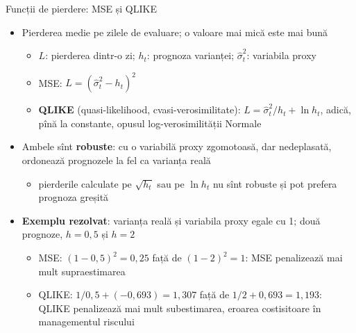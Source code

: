 \begin{frame}{Funcții de pierdere: MSE și QLIKE}
\itemsize{\small}
\begin{itemize}
    \item Pierderea medie pe zilele de evaluare; o valoare mai mică este mai bună 
    \begin{itemize}
        \item $L$: pierderea dintr-o zi; $h_t$: prognoza varianței; $\hat\sigma_t^2$: variabila proxy
        \item MSE: $L = (\hat\sigma_t^2 - h_t)^2$
        \item \textbf{QLIKE} (quasi-likelihood, cvasi-verosimilitate): $L = \hat\sigma_t^2/h_t + \ln h_t$, adică, pînă la constante, opusul log-verosimilității Normale
    \end{itemize}
    \item Ambele sînt \textbf{robuste}: cu o variabilă proxy zgomotoasă, dar nedeplasată, ordonează prognozele la fel ca varianța reală
    \begin{itemize}
        \item pierderile calculate pe $\sqrt{h_t}$ sau pe $\ln h_t$ nu sînt robuste și pot prefera prognoza greșită
    \end{itemize}
    \item \textbf{Exemplu rezolvat}: varianța reală și variabila proxy egale cu 1; două prognoze, $h = 0{,}5$ și $h = 2$
    \begin{itemize}
        \item MSE: $(1 - 0{,}5)^2 = 0{,}25$ față de $(1 - 2)^2 = 1$: MSE penalizează mai mult supraestimarea
        \item QLIKE: $1/0{,}5 + (-0{,}693) = 1{,}307$ față de $1/2 + 0{,}693 = 1{,}193$: QLIKE penalizează mai mult subestimarea, eroarea costisitoare în managementul riscului
    \end{itemize}
\end{itemize}
\end{frame}


